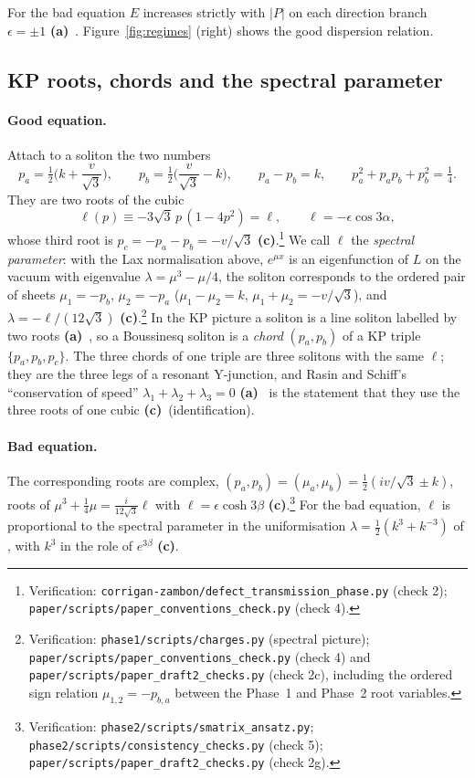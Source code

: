 \documentclass[11pt,a4paper]{article}
\newcommand{\lab}[1]{{\normalfont\sffamily\footnotesize\bfseries(#1)}}
\newcommand{\La}{\lab{a}}
\newcommand{\Lc}{\lab{c}}
\newcommand{\scr}[1]{\nolinkurl{#1}}
\newcommand{\chk}[1]{\footnote{\raggedright Verification: #1.}}
\theoremstyle{remark}
\begin{document}
For the bad equation $E$ increases strictly with $|P|$ on each direction branch $\epsilon=\pm1$ \La~\cite{BC}. Figure~\ref{fig:regimes} (right) shows the good dispersion relation.

\subsection{KP roots, chords and the spectral parameter}\label{sec:KP}

\paragraph{Good equation.} Attach to a soliton the two numbers
\begin{equation}\label{eq:roots}
p_a=\tfrac12\Big(k+\frac{v}{\sqrt3}\Big),\qquad p_b=\tfrac12\Big(\frac{v}{\sqrt3}-k\Big),\qquad p_a-p_b=k,\qquad p_a^2+p_ap_b+p_b^2=\tfrac14 .
\end{equation}
They are two roots of the cubic
\begin{equation}\label{eq:cubic}
\ell(p)\equiv-3\sqrt3\,p\,(1-4p^2)=\ell,\qquad \ell=-\epsilon\cos3\alpha ,
\end{equation}
whose third root is $p_c=-p_a-p_b=-v/\sqrt3$ \Lc.\chk{\scr{corrigan-zambon/defect_transmission_phase.py} (check 2); \scr{paper/scripts/paper_conventions_check.py} (check 4)} We call $\ell$ the \emph{spectral parameter}: with the Lax normalisation above, $e^{\mu x}$ is an eigenfunction of $L$ on the vacuum with eigenvalue $\lambda=\mu^3-\mu/4$, the soliton corresponds to the ordered pair of sheets $\mu_1=-p_b$, $\mu_2=-p_a$ ($\mu_1-\mu_2=k$, $\mu_1+\mu_2=-v/\sqrt3$), and $\lambda=-\ell/(12\sqrt3)$ \Lc.\chk{\scr{phase1/scripts/charges.py} (spectral picture); \scr{paper/scripts/paper_conventions_check.py} (check 4) and \scr{paper/scripts/paper_draft2_checks.py} (check 2c), including the ordered sign relation $\mu_{1,2}=-p_{b,a}$ between the Phase~1 and Phase~2 root variables}
In the KP picture a soliton is a line soliton labelled by two roots \La~\cite{DMHC}, so a Boussinesq soliton is a \emph{chord} $(p_a,p_b)$ of a KP triple $\{p_a,p_b,p_c\}$. The three chords of one triple are three solitons with the same $\ell$; they are the three legs of a resonant Y-junction, and Rasin and Schiff's ``conservation of speed'' $\lambda_1+\lambda_2+\lambda_3=0$ \La~\cite[\S3]{RS} is the statement that they use the three roots of one cubic \Lc\ (identification).

\paragraph{Bad equation.} The corresponding roots are complex, $(p_a,p_b)=(\mu_a,\mu_b)=\tfrac12(iv/\sqrt3\pm k)$, roots of $\mu^3+\tfrac14\mu=\tfrac{i}{12\sqrt3}\ell$ with $\ell=\epsilon\cosh3\beta$ \Lc.\chk{\scr{phase2/scripts/smatrix_ansatz.py}; \scr{phase2/scripts/consistency_checks.py} (check 5); \scr{paper/scripts/paper_draft2_checks.py} (check 2g)} For the bad equation, $\ell$ is proportional to the spectral parameter in the uniformisation $\lambda=\tfrac12(k^3+k^{-3})$ of \cite{CL-WW}, with $k^3$ in the role of $e^{3\beta}$ \Lc.
\end{document}
